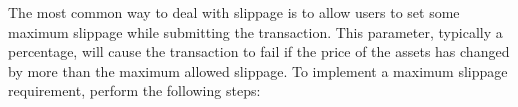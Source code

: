 \documentclass[11pt]{article}
\begin{document}
\begin{comment}
    Additionally, not sufficiently handling opens users up to a type of attack known as a sandwich attack. A sandwich attack works as follows:
\begin{enumerate}
    \item Alice submits a swap transaction to convert some large amount of currency $A$ into currency $B$.
    \item An adversary sees Alice's transaction and front-runs it with a very large purchase of currency $B$, thus raising the price of asset $B$.
    \item Alice buys currency $B$ at the new higher price, even further raising the price of currency $B$.
    \item The attacker then immediately sells all their newly acquired currency $B$ at the higher price, making a quick profit.
\end{enumerate}

Vulnerability to sandwich attacks is bad for users of a decentralized exchange, as users consistently pay higher exchange rates than the true asset value. As such, it is important that we upgrade our exchange to properly handle slippage and defend against sandwich attacks.

The most common defense against sandwich attacks is to allow users to set some maximum slippage while submitting the transaction. 

\end{comment}
The most common way to deal with slippage is to allow users to set some maximum slippage while submitting the transaction. This parameter, typically a percentage, will cause the transaction to fail if the price of the assets has changed by more than the maximum allowed slippage. To implement a maximum slippage requirement, perform the following steps:
\end{document}
